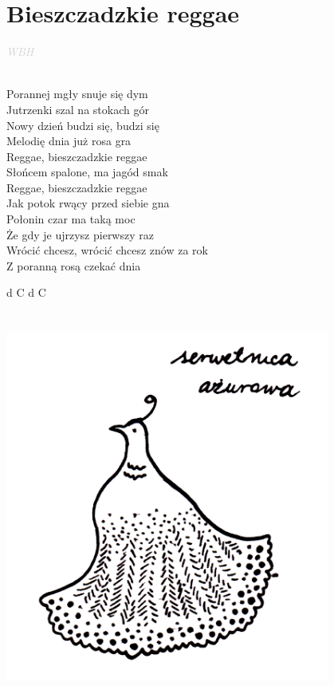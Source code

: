 \documentclass[a5paper, 10pt]{book}
\begin{document}
\section{Bieszczadzkie reggae}\textcolor{lightgray}{\textit{WBH}}\\~\\
\begin{minipage}[t]{0.6\textwidth}
Porannej mgły snuje się dym\\
Jutrzenki szal na stokach gór\\
Nowy dzień budzi się, budzi się\\
Melodię dnia już rosa gra\\

\hspace*{5mm}Reggae, bieszczadzkie reggae\\
\hspace*{5mm}Słońcem spalone, ma jagód smak\\
\hspace*{5mm}Reggae, bieszczadzkie reggae\\
\hspace*{5mm}Jak potok rwący przed siebie gna\\

Połonin czar ma taką moc\\
Że gdy je ujrzysz pierwszy raz\\
Wrócić chcesz, wrócić chcesz znów za rok\\
Z poranną rosą czekać dnia\\
\end{minipage}
\begin{minipage}[t]{0.4\textwidth}
d C d C\\
\\
\\
\includegraphics[width=0.8\textwidth]{images/bieszczadzkie_reggae.png}\\
\end{minipage}
\end{document}
